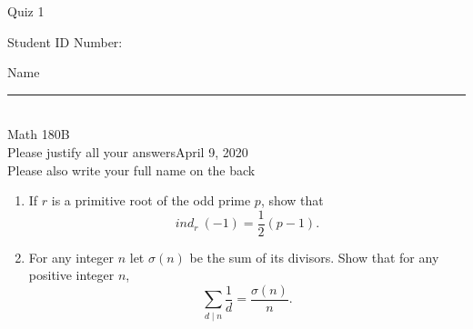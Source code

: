 \documentclass[12pt]{article}
\begin{document}
\begin{flushleft} 
\centerline{\LARGE{Quiz 1}} 
\vspace{5 mm}
{Student ID Number:}\hfill  
{Name \rule {2 in}{0.01in}}\\
Math 180B
\\
{Please justify all your answers}\hfill {April 9, 2020}
\\
{Please also write your full name on the back} 

\medskip
\end{flushleft}

\begin{enumerate}
	\item If $r$ is a primitive root of the odd prime $p$, show that
	\[
	ind_r\ (-1) = \frac{1}{2}(p-1).
	\]
	\vfill

	\item For any integer $n$ let $\sigma(n)$ be the sum of its divisors. Show that for any positive integer $n$,
	\[
	\sum_{d\mid n}\frac{1}{d} = \frac{\sigma(n)}{n}.
	\]
	\vfill
\end{enumerate}
\end{document}

